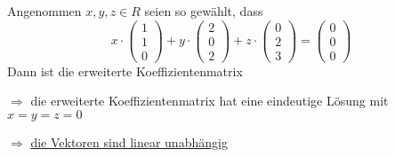 \documentclass{scrreprt}
\begin{document}
\begin{enumerate}[(a)]
  Angenommen $x, y, z \in R$ seien so gewählt, dass
  \[
    x \cdot \begin{pmatrix}1 \\ 1 \\ 0\end{pmatrix} +
    y \cdot \begin{pmatrix}2 \\ 0 \\ 2\end{pmatrix} +
    z \cdot \begin{pmatrix}0 \\ 2 \\ 3\end{pmatrix} =
    \begin{pmatrix}0 \\ 0 \\ 0\end{pmatrix}
  \]
  Dann ist die erweiterte Koeffizientenmatrix

  $\Rightarrow$ die erweiterte Koeffizientenmatrix hat eine eindeutige Lösung
  mit $x = y = z = 0$

  $\Rightarrow$ \underline{die Vektoren sind linear unabhängig}
\end{enumerate}
\end{document}
